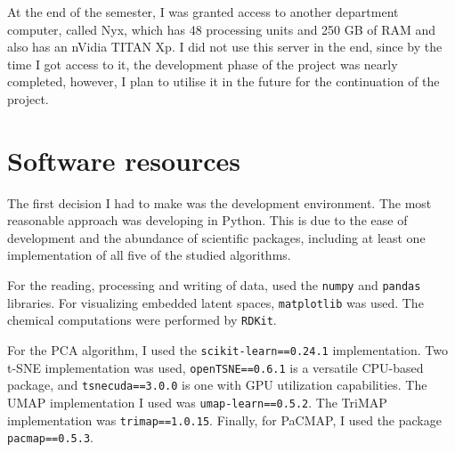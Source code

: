 At the end of the semester, I was granted access to another department computer, called Nyx, which has 48 processing units and 250 GB of RAM and also has an nVidia TITAN Xp. I did not use this server in the end, since by the time I got access to it, the development phase of the project was nearly completed, however, I plan to utilise it in the future for the continuation of the project.

\section{Software resources}

The first decision I had to make was the development environment. The most reasonable approach was developing in Python. This is due to the ease of development and the abundance of scientific packages, including at least one implementation of all five of the studied algorithms. 

For the reading, processing and writing of data, used the \texttt{numpy} and \texttt{pandas} libraries. For visualizing embedded latent spaces, \texttt{matplotlib} was used. The chemical computations were performed by \texttt{RDKit}\cite{bib:rdkit}.

For the PCA algorithm, I used the \texttt{scikit-learn==0.24.1} implementation. Two t-SNE implementation was used, \texttt{openTSNE==0.6.1} is a versatile CPU-based package, and \texttt{tsnecuda==3.0.0} is one with GPU utilization capabilities. The UMAP implementation I used was \texttt{umap-learn==0.5.2}. The TriMAP implementation was \texttt{trimap==1.0.15}. Finally, for PaCMAP, I used the package \texttt{pacmap==0.5.3}.